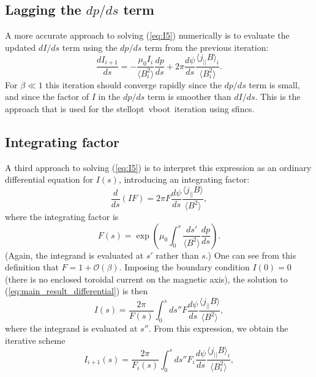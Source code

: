 \documentclass[11pt,letter]{article}
\newcommand{\stellopt}{{\ttfamily stellopt}}
\newcommand{\vboot}{{\ttfamily vboot}}
\newcommand{\sfincs}{{\ttfamily sfincs}}
\begin{document}
\subsection{Lagging the $dp/ds$ term}
A more accurate approach to solving (\ref{eq:I5}) numerically is to evaluate the updated $dI/ds$ term using the $dp/ds$ term
from the previous iteration:
\begin{equation}
 \frac{dI_{i+1}}{ds} 
 =-\frac{\mu_0 I_i}{\langle B_{i}^2 \rangle}
\frac{dp}{ds} 
+
2\pi
\frac{d\psi}{ds}
\frac{ \langle j_{||} B \rangle_{i}} {\langle B_{i}^2 \rangle}.
\label{eq:iteration_lag}
\end{equation}
 For $\beta\ll1$ this iteration should converge rapidly since the $dp/ds$ term is small, and since the factor of $I$ in the $dp/ds$ term is smoother than $dI/ds$. This is the approach that is used for the \stellopt~\vboot~iteration using \sfincs.

\subsection{Integrating factor}
A third approach to solving (\ref{eq:I5}) is to interpret this expression as an ordinary differential equation for $I(s)$, introducing an integrating factor:
\begin{equation}
\frac{d}{ds} \left( I F\right)  =
2\pi F
\frac{d\psi}{ds}
\frac{ \langle j_{||} B \rangle} {\langle B^2 \rangle},
\label{eq:main_result_differential}
\end{equation}
where the integrating factor is
\begin{equation}
F(s) =   \exp\left( \mu_0 \int_0^s \frac{ds'}{\langle B^2 \rangle} \frac{dp}{ds} \right).
\end{equation}
(Again, the integrand is evaluated at $s'$ rather than $s$.)
One can see from this definition that $F = 1 + \mathcal{O}(\beta)$.
Imposing the boundary condition $I(0)=0$
(there is no enclosed toroidal current on the magnetic axis),
the solution to (\ref{eq:main_result_differential}) is then
\begin{equation}
 I(s)  = \frac{2\pi}{F(s)} \int_0^s ds''
F
\frac{d\psi}{ds}
\frac{ \langle j_{||} B \rangle} {\langle B^2 \rangle},
\label{eq:main_result}
\end{equation}
where the integrand is evaluated at $s''$. From this expression,
we obtain the iterative scheme
\begin{equation}
 I_{i+1}(s)  = \frac{2\pi}{F_i(s)} \int_0^s ds''
F_i
\frac{d\psi}{ds}
\frac{ \langle j_{||} B \rangle_i} {\langle B_i^2 \rangle},
\label{eq:iteration_integrating_factor}
\end{equation}
\end{document}
